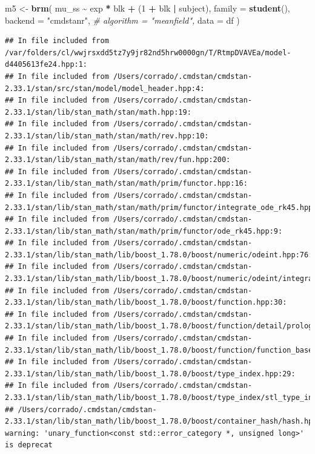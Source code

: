 \documentclass[
]{article}
\newenvironment{Shaded}{\begin{snugshade}}{\end{snugshade}}
\newcommand{\AttributeTok}[1]{\textcolor[rgb]{0.13,0.29,0.53}{#1}}
\newcommand{\CommentTok}[1]{\textcolor[rgb]{0.56,0.35,0.01}{\textit{#1}}}
\newcommand{\DecValTok}[1]{\textcolor[rgb]{0.00,0.00,0.81}{#1}}
\newcommand{\FunctionTok}[1]{\textcolor[rgb]{0.13,0.29,0.53}{\textbf{#1}}}
\newcommand{\NormalTok}[1]{#1}
\newcommand{\OtherTok}[1]{\textcolor[rgb]{0.56,0.35,0.01}{#1}}
\newcommand{\SpecialCharTok}[1]{\textcolor[rgb]{0.81,0.36,0.00}{\textbf{#1}}}
\newcommand{\StringTok}[1]{\textcolor[rgb]{0.31,0.60,0.02}{#1}}
\begin{document}
\begin{Shaded}
\begin{Highlighting}[]
\NormalTok{m5 }\OtherTok{\textless{}{-}} \FunctionTok{brm}\NormalTok{(}
\NormalTok{  mu\_ss }\SpecialCharTok{\textasciitilde{}}\NormalTok{ exp }\SpecialCharTok{*}\NormalTok{ blk }\SpecialCharTok{+}\NormalTok{ (}\DecValTok{1} \SpecialCharTok{+}\NormalTok{ blk }\SpecialCharTok{|}\NormalTok{ subject),}
  \AttributeTok{family =} \FunctionTok{student}\NormalTok{(),}
  \AttributeTok{backend =} \StringTok{"cmdstanr"}\NormalTok{,}
  \CommentTok{\# algorithm = "meanfield",}
  \AttributeTok{data =}\NormalTok{ df}
\NormalTok{)}
\end{Highlighting}
\end{Shaded}

\begin{verbatim}
## In file included from /var/folders/cl/wwjrsxdd5tz7y9jr82nd5hrw0000gn/T/RtmpDVAVEa/model-d4405613fe24.hpp:1:
## In file included from /Users/corrado/.cmdstan/cmdstan-2.33.1/stan/src/stan/model/model_header.hpp:4:
## In file included from /Users/corrado/.cmdstan/cmdstan-2.33.1/stan/lib/stan_math/stan/math.hpp:19:
## In file included from /Users/corrado/.cmdstan/cmdstan-2.33.1/stan/lib/stan_math/stan/math/rev.hpp:10:
## In file included from /Users/corrado/.cmdstan/cmdstan-2.33.1/stan/lib/stan_math/stan/math/rev/fun.hpp:200:
## In file included from /Users/corrado/.cmdstan/cmdstan-2.33.1/stan/lib/stan_math/stan/math/prim/functor.hpp:16:
## In file included from /Users/corrado/.cmdstan/cmdstan-2.33.1/stan/lib/stan_math/stan/math/prim/functor/integrate_ode_rk45.hpp:6:
## In file included from /Users/corrado/.cmdstan/cmdstan-2.33.1/stan/lib/stan_math/stan/math/prim/functor/ode_rk45.hpp:9:
## In file included from /Users/corrado/.cmdstan/cmdstan-2.33.1/stan/lib/stan_math/lib/boost_1.78.0/boost/numeric/odeint.hpp:76:
## In file included from /Users/corrado/.cmdstan/cmdstan-2.33.1/stan/lib/stan_math/lib/boost_1.78.0/boost/numeric/odeint/integrate/observer_collection.hpp:23:
## In file included from /Users/corrado/.cmdstan/cmdstan-2.33.1/stan/lib/stan_math/lib/boost_1.78.0/boost/function.hpp:30:
## In file included from /Users/corrado/.cmdstan/cmdstan-2.33.1/stan/lib/stan_math/lib/boost_1.78.0/boost/function/detail/prologue.hpp:17:
## In file included from /Users/corrado/.cmdstan/cmdstan-2.33.1/stan/lib/stan_math/lib/boost_1.78.0/boost/function/function_base.hpp:21:
## In file included from /Users/corrado/.cmdstan/cmdstan-2.33.1/stan/lib/stan_math/lib/boost_1.78.0/boost/type_index.hpp:29:
## In file included from /Users/corrado/.cmdstan/cmdstan-2.33.1/stan/lib/stan_math/lib/boost_1.78.0/boost/type_index/stl_type_index.hpp:47:
## /Users/corrado/.cmdstan/cmdstan-2.33.1/stan/lib/stan_math/lib/boost_1.78.0/boost/container_hash/hash.hpp:132:33: warning: 'unary_function<const std::error_category *, unsigned long>' is deprecat
\end{verbatim}
\end{document}
